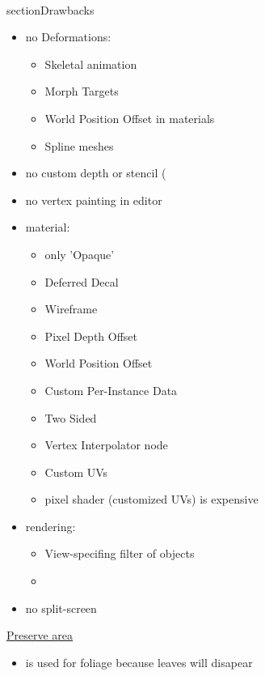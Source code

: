     \\section{Drawbacks}
        \begin{itemize}
            \item no Deformations:
            \begin{itemize}
                \item Skeletal animation
                \item Morph Targets
                \item World Position Offset in materials
                \item Spline meshes
            \end{itemize}
            \item no custom depth or stencil (%
            \item no vertex painting in editor
            \item material:
            \begin{itemize}
                \item only 'Opaque'
                \item Deferred Decal
                \item Wireframe
                \item Pixel Depth Offset
                \item World Position Offset
                \item Custom Per-Instance Data
                \item Two Sided
                \item Vertex Interpolator node
                \item Custom UVs
                \item pixel shader (customized UVs) is expensive
            \end{itemize}
            \item rendering:
            \begin{itemize}
                \item View-specifing filter of objects
                \item 
            \end{itemize}
            \item no split-screen
        \end{itemize}

        \uline{Preserve area}
        \begin{itemize}
            \item is used for foliage because leaves will disapear
        \end{itemize}
